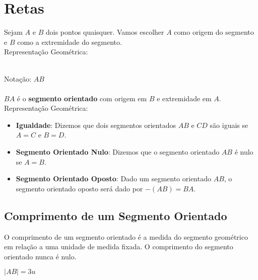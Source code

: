 \documentclass[ ]{article}
\begin{document}
	\section{Retas}
		Sejam $A$ e $B$ dois pontos quaisquer. Vamos escolher $A$ como origem do segmento e $B$ como a extremidade do segmento.\\
		Representação Geométrica:
		\\
		Notação: $AB$\\ \\
		$BA$ é o \textbf{segmento orientado} com origem em $B$ e extremidade em $A$.\\
		Representação Geométrica:
		\begin{itemize}
			\item \textbf{Igualdade}: Dizemos que dois segmentos orientados $AB$ e $CD$ são iguais se $A = C$ e $B = D$.
			\item \textbf{Segmento Orientado Nulo}: Dizemos que o segmento orientado $AB$ é nulo se $A=B$.
			\item \textbf{Segmento Orientado Oposto}: Dado um segmento orientado $AB$, o segmento orientado oposto será dado por $-(AB)=BA$.
		\end{itemize}
		\subsection{Comprimento de um Segmento Orientado}
			O comprimento de um segmento orientado é a medida do segmento geométrico em relação a uma unidade de medida fixada. O comprimento do segmento orientado nunca é nulo.\\
			$|AB| = 3u$
			
\end{document}
